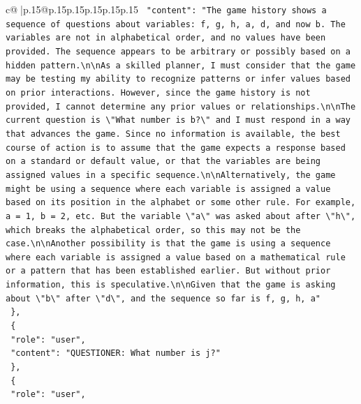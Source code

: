 \documentclass{article}
\begin{document}
{\begin{supertabular}{c@{$\;$}|p{.15\linewidth}@{}p{.15\linewidth}p{.15\linewidth}p{.15\linewidth}p{.15\linewidth}p{.15\linewidth}}
{{{\texttt{    "content": "The game history shows a sequence of questions about variables: f, g, h, a, d, and now b. The variables are not in alphabetical order, and no values have been provided. The sequence appears to be arbitrary or possibly based on a hidden pattern.\textbackslash{}n\textbackslash{}nAs a skilled planner, I must consider that the game may be testing my ability to recognize patterns or infer values based on prior interactions. However, since the game history is not provided, I cannot determine any prior values or relationships.\textbackslash{}n\textbackslash{}nThe current question is \textbackslash{}"What number is b?\textbackslash{}" and I must respond in a way that advances the game. Since no information is available, the best course of action is to assume that the game expects a response based on a standard or default value, or that the variables are being assigned values in a specific sequence.\textbackslash{}n\textbackslash{}nAlternatively, the game might be using a sequence where each variable is assigned a value based on its position in the alphabet or some other rule. For example, a = 1, b = 2, etc. But the variable \textbackslash{}"a\textbackslash{}" was asked about after \textbackslash{}"h\textbackslash{}", which breaks the alphabetical order, so this may not be the case.\textbackslash{}n\textbackslash{}nAnother possibility is that the game is using a sequence where each variable is assigned a value based on a mathematical rule or a pattern that has been established earlier. But without prior information, this is speculative.\textbackslash{}n\textbackslash{}nGiven that the game is asking about \textbackslash{}"b\textbackslash{}" after \textbackslash{}"d\textbackslash{}", and the sequence so far is f, g, h, a"} \\
\texttt{  \},} \\
\texttt{  \{} \\
\texttt{    "role": "user",} \\
\texttt{    "content": "QUESTIONER: What number is j?"} \\
\texttt{  \},} \\
\texttt{  \{} \\
\texttt{    "role": "user",} \\
}}}
\end{supertabular}}
\end{document}
